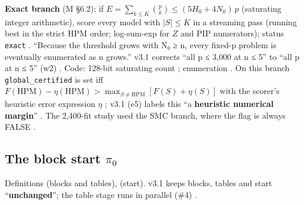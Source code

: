 \textbf{Exact branch} (M \S6.2): if $E=\sum_{k\le K}\binom pk\le(5H_0+4N_0)\,p$ (saturating integer arithmetic), score every
model with $|S|\le K$ in a streaming pass (running best in the strict HPM order; log-sum-exp for $Z$ and PIP numerators);
status \texttt{exact} . ``Because the threshold grows with N₀ ≥ n, every
fixed-p problem is eventually enumerated as n grows.'' v3.1 corrects ``all p ≤ 3,000 at n ≤ 5'' to ``all p at n ≤ 5'' (w2)
. Code: 128-bit saturating count
; enumeration
. On this branch
\texttt{global\_certified} is set iff $F(\mathrm{HPM})-\eta(\mathrm{HPM})>\max_{S\ne\mathrm{HPM}}[F(S)+\eta(S)]$ with the
scorer's heuristic error expression $\eta$ ;
v3.1 (e5) labels this ``a \textbf{heuristic numerical margin}'' .
The 2,400-fit study used the SMC branch, where the flag is always FALSE
.

\subsection{The block start \texorpdfstring{$\pi_0$}{pi0}}\label{sec:method-start}

Definitions  (blocks and tables),  (start). v3.1 keeps blocks, tables and start ``\textbf{unchanged}'';
the table stage runs in parallel (\#4) .

